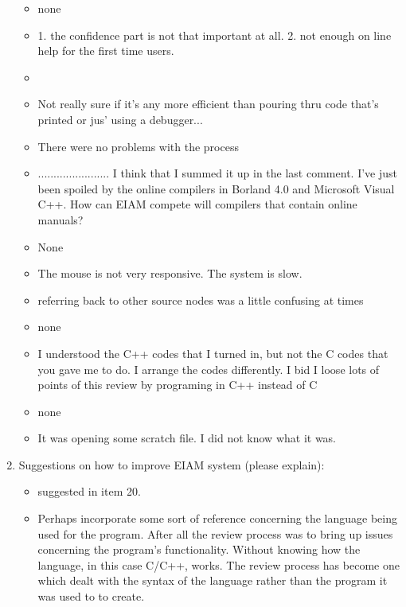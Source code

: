 \begin{enumerate}
\begin{itemize}
\item none
\item 1. the confidence part is not that important at all. 
2. not enough on line help for the first time users.

\item 

\item Not really sure if it's any more efficient than pouring thru code
that's printed or jus' using a debugger...
\item There were no problems with the process
\item 	     .......................
I think that I summed it up in the last comment.  I've just been
spoiled by the online compilers in Borland 4.0 and Microsoft Visual
C++.  How can EIAM compete will compilers that contain online manuals?


\item None
\item The mouse is not very responsive.  The system is slow.
\item referring back to other source nodes was a little confusing at times
\item none
\item I understood the C++ codes that I turned in, but not the C codes that
you gave me to do.  I arrange the codes differently.  I bid I loose
lots of points of this review by programing in C++ instead of C 
\item none
\item It was opening some scratch file.
I did not know what it was.
\end{itemize}

\item  Suggestions on how to improve EIAM system (please explain):
\begin{itemize}
\item suggested in item 20.
\item Perhaps incorporate some sort of reference concerning the language
being used for the program.  After all the review process was to bring
up issues concerning the program's functionality.  Without knowing how
the language, in this case C/C++, works.  The review process has
become one which dealt with the syntax of the language rather than the
program it was used to to create.


\end{itemize}
\end{enumerate}
